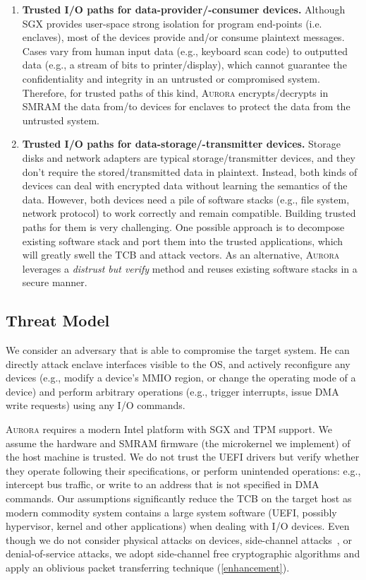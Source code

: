 \begin{enumerate}

\item \textbf{Trusted I/O paths for data-provider/-consumer devices.}
Although SGX provides user-space strong isolation for program end-points (i.e. enclaves), most of the devices provide and/or consume plaintext messages. Cases vary from human input data (e.g., keyboard scan code) to outputted data (e.g., a stream of bits to printer/display), which cannot guarantee the confidentiality and integrity in an untrusted or compromised system. Therefore, for trusted paths of this kind, \textsc{Aurora} encrypts/decrypts in SMRAM the data from/to devices for enclaves to protect the data from the untrusted system.

\item \textbf{Trusted I/O paths for data-storage/-transmitter devices.} Storage disks and network adapters are typical storage/transmitter devices, and they don't require the stored/transmitted data in plaintext. Instead, both kinds of devices can deal with encrypted data without learning the semantics of the data. However, both devices need a pile of software stacks (e.g., file system, network protocol) to work correctly and remain compatible. Building trusted paths for them is very challenging. One possible approach is to decompose existing software stack and port them into the trusted applications, which will greatly swell the TCB and attack vectors. As an alternative, \textsc{Aurora} leverages a \emph{distrust but verify} method and reuses existing software stacks in a secure manner.

\end{enumerate}

\subsection{Threat Model}
We consider an adversary that is able to compromise the target system. He can directly attack enclave interfaces visible to the OS, and actively reconfigure any devices (e.g., modify a device’s MMIO region, or change the operating mode of a device) and perform arbitrary operations (e.g., trigger interrupts, issue DMA write requests) using any I/O commands.

\textsc{Aurora} requires a modern Intel platform with SGX and TPM support. We assume the hardware and SMRAM firmware (the microkernel we implement) of the host machine is trusted. We do not trust the UEFI drivers but verify whether they operate following their specifications, or perform unintended operations: e.g., intercept bus traffic, or write to an address that is not specified in DMA commands. Our assumptions significantly reduce the TCB on the target host as modern commodity system contains a large system software (UEFI, possibly hypervisor, kernel and other applications) when dealing with I/O devices.
Even though we do not consider physical attacks on devices, side-channel attacks~\cite{chen2019sgxpectre, ridl}, or denial-of-service attacks, we adopt side-channel free cryptographic algorithms and apply an oblivious packet transferring technique (\autoref{enhancement}).



